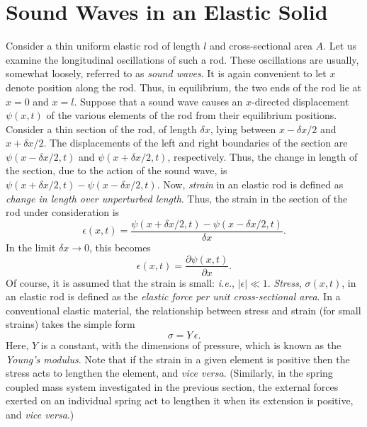 \section{Sound Waves in an Elastic Solid}\label{s6.2}
Consider a thin uniform elastic rod of length $l$ and cross-sectional area $A$. 
Let us examine the longitudinal oscillations of such a rod. These oscillations
are usually, somewhat loosely,  referred to as {\em sound waves}. It is again convenient to
let $x$ denote position along the rod. Thus, in equilibrium, the
two ends of the rod lie at $x=0$ and $x=l$. Suppose that a sound wave
causes an $x$-directed displacement $\psi(x,t)$  of the various elements of the rod from their equilibrium positions. Consider a thin section of the rod, of length $\delta x$,  lying between
$x-\delta x/2$ and $x+\delta x/2$. The displacements of the left and right boundaries
of the section are $\psi(x-\delta x/2,t)$ and $\psi(x+\delta x/2,t)$, respectively. Thus, the
change in length of the section, due to the action of the sound wave,  is $\psi(x+\delta x/2,t)-\psi(x-\delta x/2,t)$. Now,
{\em strain}\/ in an elastic rod is defined as {\em change in length over unperturbed
length}. Thus, the strain in the section of the rod under consideration is
\begin{equation}
\epsilon(x,t) = \frac{ \psi(x+\delta x/2,t)-\psi(x-\delta x/2,t)}{\delta x}.
\end{equation}
In the limit $\delta x\rightarrow 0$, this becomes
\begin{equation}\label{e6.11}
\epsilon(x,t) = \frac{\partial \psi(x,t)}{\partial x}.
\end{equation}
Of course, it is assumed that the strain is small: {\em i.e.}, $|\epsilon|\ll 1$.
 {\em Stress}, $\sigma(x,t)$,  in an elastic rod is defined as the {\em elastic force
per unit cross-sectional area}. In a conventional elastic material, the relationship
between stress and strain (for small strains) takes the simple form
\begin{equation}\label{e6.12}
\sigma = Y\,\epsilon.
\end{equation}
Here, $Y$ is a constant, with the dimensions of pressure, which is known as the 
{\em Young's modulus}. Note that if the strain in a given element is positive then the stress acts to lengthen the
element, and {\em vice versa}. (Similarly, in the spring coupled mass
system investigated in the previous section, the external forces exerted on an
individual spring act to lengthen it when its extension is positive, and {\em vice versa}.)

